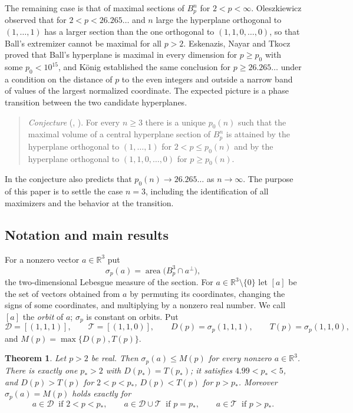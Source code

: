 \documentclass[11pt]{amsart}
\newtheorem{theorem}{Theorem}[section]
\theoremstyle{definition}
\theoremstyle{remark}
\numberwithin{equation}{section}
\newcommand{\R}{\mathbb{R}}
\newcommand{\area}{\operatorname{area}}
\newcommand{\cD}{\mathcal{D}}
\newcommand{\cT}{\mathcal{T}}
\begin{document}
The remaining case is that of maximal sections of $B_p^n$ for $2<p<\infty$. Oleszkiewicz \cite{Ole} observed that for $2<p<26.265\ldots$ and $n$ large the hyperplane orthogonal to $(1,\dots,1)$ has a larger section than the one orthogonal to $(1,1,0,\dots,0)$, so that Ball's extremizer cannot be maximal for all $p>2$. Eskenazis, Nayar and Tkocz \cite{ENT} proved that Ball's hyperplane is maximal in every dimension for $p\ge p_0$ with some $p_0<10^{15}$, and König \cite{Koe} established the same conclusion for $p\ge 26.265\ldots$ under a condition on the distance of $p$ to the even integers and outside a narrow band of values of the largest normalized coordinate. The expected picture is a phase transition between the two candidate hyperplanes.

\begin{quote}
\emph{Conjecture} (\cite[Conjecture~2]{NT}, \cite[Conjecture~2]{ENT}). For every $n\ge 3$ there is a unique $p_0(n)$ such that the maximal volume of a central hyperplane section of $B_p^n$ is attained by the hyperplane orthogonal to $(1,\dots,1)$ for $2<p\le p_0(n)$ and by the hyperplane orthogonal to $(1,1,0,\dots,0)$ for $p\ge p_0(n)$.
\end{quote}

In \cite{ENT} the conjecture also predicts that $p_0(n)\to 26.265\ldots$ as $n\to\infty$. The purpose of this paper is to settle the case $n=3$, including the identification of all maximizers and the behavior at the transition.

\subsection{Notation and main results}
For a nonzero vector $a\in\R^3$ put
\[
\sigma_p(a)=\area\bigl(B_p^3\cap a^\perp\bigr),
\]
the two-dimensional Lebesgue measure of the section. For $a\in\R^3\setminus\{0\}$ let $[a]$ be the set of vectors obtained from $a$ by permuting its coordinates, changing the signs of some coordinates, and multiplying by a nonzero real number. We call $[a]$ the \emph{orbit} of $a$; $\sigma_p$ is constant on orbits. Put
\[
\cD=[(1,1,1)],\qquad \cT=[(1,1,0)],\qquad D(p)=\sigma_p(1,1,1),\qquad T(p)=\sigma_p(1,1,0),
\]
and $M(p)=\max\{D(p),T(p)\}$.

\begin{theorem}\label{thm:main}
Let $p>2$ be real. Then $\sigma_p(a)\le M(p)$ for every nonzero $a\in\R^3$. There is exactly one $p_*>2$ with $D(p_*)=T(p_*)$; it satisfies $4.99<p_*<5$, and $D(p)>T(p)$ for $2<p<p_*$, $D(p)<T(p)$ for $p>p_*$. Moreover $\sigma_p(a)=M(p)$ holds exactly for
\[
a\in\cD \ \text{ if } 2<p<p_*,\qquad a\in\cD\cup\cT \ \text{ if } p=p_*,\qquad a\in\cT \ \text{ if } p>p_*.
\]
\end{theorem}
\end{document}
